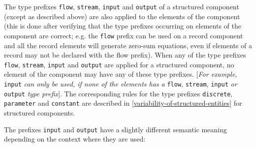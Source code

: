 The type prefixes \lstinline!flow!, \lstinline!stream!, \lstinline!input!
and \lstinline!output! of a structured
component (except as described above) are also applied to the elements
of the component (this is done after verifying that the type prefixes
occurring on elements of the component are correct; e.g. the \lstinline!flow! prefix
can be used on a record component and all the record elements will
generate zero-sum equations, even if elements of a record may not be
declared with the flow prefix). When any of the type prefixes \lstinline!flow!,
\lstinline!stream!, \lstinline!input! and \lstinline!output! are applied for a structured component, no
element of the component may have any of these type prefixes.
{[}\emph{For example,} \lstinline!input! \emph{can only be used, if none of the
elements has a} \lstinline!flow!, \lstinline!stream!, \lstinline!input! \emph{or} 
\lstinline!output! \emph{type
prefix}{]}. The corresponding rules for the type prefixes \lstinline!discrete!,
\lstinline!parameter! and \lstinline!constant! are described in \autoref{variability-of-structured-entities} for structured
components.

The prefixes \lstinline!input! and \lstinline!output! have a slightly different semantic meaning
depending on the context where they are used:

